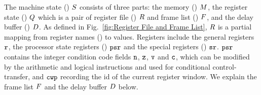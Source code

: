 The machine state () $S$ consists of three parts:
the memory () $M$, 
the register state () $Q$
which is a pair of register file 
() $R$ and frame list () $F$,
and the delay buffer () $D$.
As defined in Fig.~\ref{fig:Register File and Frame List},
$R$ is a partial mapping
from register names () to values.
Registers include the general registers $\texttt{r}$,
the processor state registers () $\texttt{psr}$
and the special registers () $\texttt{sr}$.
$\texttt{psr}$ contains
the integer condition code fields $\texttt{n}$,
$\texttt{z}$, $\texttt{v}$ and $\texttt{c}$,
which can be modified by the arithmetic and logical instructions
and used for conditional control-transfer,
and $\texttt{cwp}$ recording the id of the current register window.
We explain the frame list $F$ and the delay buffer
$D$ below.

